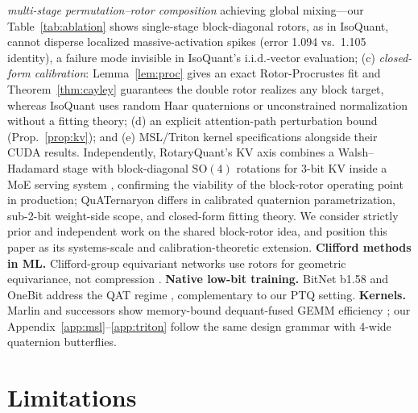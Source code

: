 \documentclass{article}
\begin{document}
\emph{multi-stage permutation--rotor composition} achieving global mixing---our
Table~\ref{tab:ablation} shows single-stage block-diagonal rotors, as in
IsoQuant, cannot disperse localized massive-activation spikes (error 1.094 vs.\
1.105 identity), a failure mode invisible in IsoQuant's i.i.d.-vector
evaluation; (c) \emph{closed-form calibration}: Lemma~\ref{lem:proc} gives an
exact Rotor-Procrustes fit and Theorem~\ref{thm:cayley} guarantees the double
rotor realizes any block target, whereas IsoQuant uses random Haar quaternions
or unconstrained normalization without a fitting theory; (d) an explicit
attention-path perturbation bound (Prop.~\ref{prop:kv}); and (e) MSL/Triton
kernel specifications alongside their CUDA results. Independently,
RotaryQuant's KV axis combines a Walsh--Hadamard stage with block-diagonal
$\mathrm{SO}(4)$ rotations for 3-bit KV inside a MoE serving system
\citep{lui2026rotaryquant}, confirming the viability of the block-rotor
operating point in production; QuATernaryon differs in calibrated quaternion
parametrization, sub-2-bit weight-side scope, and closed-form fitting theory.
We consider
\citep{ji2026isoquant} strictly prior and independent work on the shared
block-rotor idea, and position this paper as its systems-scale and
calibration-theoretic extension. \textbf{Clifford methods in ML.} Clifford-group
equivariant networks use rotors for geometric equivariance, not compression
\citep{ruhe2023clifford}. \textbf{Native low-bit training.}
BitNet b1.58 and OneBit address the QAT regime
\citep{wang2025bitnet,xu2024onebit}, complementary to our PTQ setting.
\textbf{Kernels.} Marlin and successors show memory-bound dequant-fused GEMM
efficiency \citep{frantar2024marlin}; our Appendix~\ref{app:msl}--\ref{app:triton}
follow the same design grammar with 4-wide quaternion butterflies.

\section{Limitations}
\label{sec:limitations}
\end{document}
